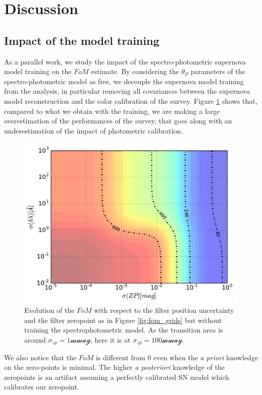 \documentclass[\docopts]{\docclass}
\begin{document}

\section{Discussion}
\label{sec::discussion}
\subsection{Impact of the model training}
\label{ssec::training}
As a parallel work, we study the impact of the spectro-photometric supernova model training on the $FoM$ estimate.
By considering the $\theta_P$ parameters of the spectro-photometric model as free, we decouple the supernova model training from the analysis, in particular removing all covariances between the supernova model reconstruction and the color calibration of the survey.
Figure \ref{fig:fom_wout_training} shows that, compared to what we obtain with the training, we are making a large overestimation of the performances of the survey, that goes along with an underestimation of the impact of photometric calibration.
\begin{figure}[ht]
  \centering
  \includegraphics[width=\linewidth]{FoM-grid_10-seasons_AltSched_no-training.pdf}
  \caption{Evolution of the $FoM$ with respect to the filter position
    uncertainty and the filter zeropoint as in Figure
    \ref{fig:fom_grids} but without training the spectrophotometric
    model. As the transition area is around $\sigma_{zp} = 1\mathcal{mmag}$, here it is at $\sigma_{zp} = 100\mathcal{mmag}$.}
  \label{fig:fom_wout_training}
\end{figure}
We also notice that the $FoM$ is different from 0 even when the \textit{a priori} knowledge on the zero-points is minimal.
The higher \textit{a posteriori} knowledge of the zeropoints is an artifact assuming a perfectly calibrated SN model which calibrates our zeropoint.
\end{document}
